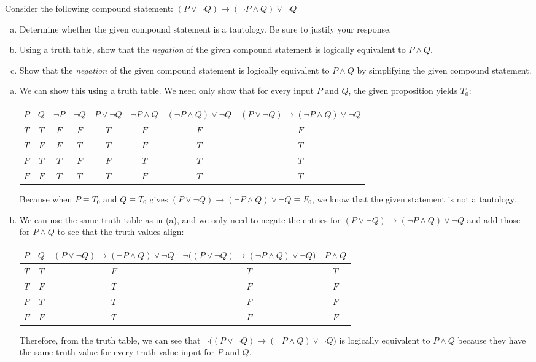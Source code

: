 \documentclass[11pt,letterpaper]{article}
\begin{document}
 Consider the following compound statement: $(P \vee \neg Q) \to (\neg P \wedge Q) \vee \neg Q$
	\begin{enumerate}[(a)]
	\item Determine whether the given compound statement is a tautology. Be sure to justify your response. 
	\item Using a truth table, show that the \textit{negation} of the given compound statement is logically equivalent to $P \wedge Q$. 
	\item Show that the \textit{negation} of the given compound statement is logically equivalent to $P \wedge Q$ by simplifying the given compound statement.
	\end{enumerate}\sol 
\begin{enumerate}[(a)]
\item We can show this using a truth table. We need only show that for every input $P$ and $Q$, the given proposition yields $T_0$: \par
	\begin{table}[!ht]
	\centering
	\begin{tabular}{cc||ccccc|c}
	$P$ & $Q$ & $\neg P$ & $\neg Q$ & $P \vee \neg Q$ & $\neg P \wedge Q$ & $(\neg P \wedge Q) \vee \neg Q$ & $(P \vee \neg Q) \to (\neg P \wedge Q) \vee \neg Q$ \\ \hline 
	$T$ & $T$ & $F$ & $F$ & $T$ & $F$ & $F$ & $F$ \\
	$T$ & $F$ & $F$ & $T$ & $T$ & $F$ & $T$ & $T$ \\
	$F$ & $T$ & $T$ & $F$ & $F$ & $T$ & $T$ & $T$ \\
	$F$ & $F$ & $T$ & $T$ & $T$ & $F$ &  $T$ & $T$
	\end{tabular}
	\end{table} \par
Because when $P \equiv T_0$ and $Q \equiv T_0$ gives $(P \vee \neg Q) \to (\neg P \wedge Q) \vee \neg Q \equiv F_0$, we know that the given statement is not a tautology. 

\item We can use the same truth table as in (a), and we only need to negate the entries for $(P \vee \neg Q) \to (\neg P \wedge Q) \vee \neg Q$ and add those for $P \wedge Q$ to see that the truth values align:
	\begin{table}[!ht]
	\centering
	\begin{tabular}{cc||c|c|c}
	$P$ & $Q$ & $(P \vee \neg Q) \to (\neg P \wedge Q) \vee \neg Q$ & $\neg \big( (P \vee \neg Q) \to (\neg P \wedge Q) \vee \neg Q \big)$ & $P \wedge Q$ \\ \hline 
	$T$ & $T$ & $F$ & $T$ & $T$ \\
	$T$ & $F$ & $T$ & $F$ & $F$ \\
	$F$ & $T$ & $T$ & $F$ & $F$ \\
	$F$ & $F$ & $T$ & $F$ & $F$
	\end{tabular}
	\end{table} \par
Therefore, from the truth table, we can see that $\neg \big( (P \vee \neg Q) \to (\neg P \wedge Q) \vee \neg Q \big)$ is logically equivalent to $P \wedge Q$ because they have the same truth value for every truth value input for $P$ and $Q$. 


\end{enumerate}
\end{document}
